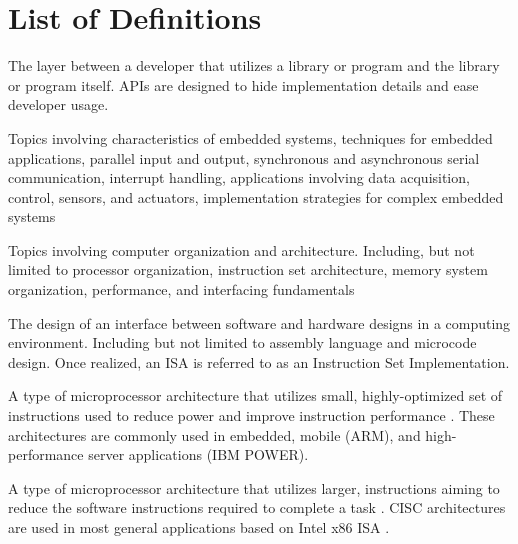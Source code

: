 
\chapter*{List of Definitions}

\begin{definition}
    The layer between a developer that utilizes a library or program and the library or program itself. APIs are designed to hide implementation details and ease developer usage.
\end{definition}

\begin{definition} 
	Topics involving characteristics of embedded systems, techniques for embedded applications, parallel input and output, synchronous and asynchronous serial communication, interrupt handling, applications involving data acquisition, control, sensors, and actuators, implementation strategies for complex embedded systems \cite[p.~118]{cec2016}
\end{definition}

\begin{definition} 
	Topics involving computer organization and architecture. Including, but not limited to processor organization, instruction set architecture, memory system organization, performance, and interfacing fundamentals\cite[p.~118]{cec2016}
\end{definition}

\begin{definition}
    The design of an interface between software and hardware designs in a computing environment. Including but not limited to assembly language and microcode design. Once realized, an ISA is referred to as an Instruction Set Implementation. 
\end{definition}

\begin{definition}
    A type of microprocessor architecture that utilizes small, highly-optimized set of instructions used to reduce power and improve instruction performance \cite{Aletan1992, Stokes1999}. These architectures are commonly used in embedded, mobile (ARM), and high-performance server applications (IBM POWER). 
\end{definition}

\begin{definition}
    A type of microprocessor architecture that utilizes larger, instructions aiming to reduce the software instructions required to complete a task \cite{Aletan1992, Stokes1999}. CISC architectures are used in most general applications based on Intel\textregistered{} x86 ISA \cite{intel2017}.
\end{definition}

